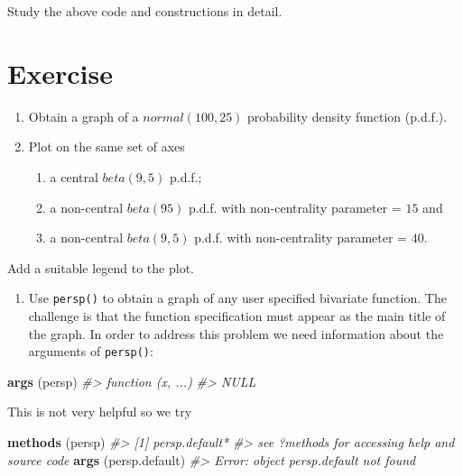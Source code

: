 \documentclass[
]{book}
\newenvironment{Shaded}{\begin{snugshade}}{\end{snugshade}}
\newcommand{\CommentTok}[1]{\textcolor[rgb]{0.56,0.35,0.01}{\textit{#1}}}
\newcommand{\FunctionTok}[1]{\textcolor[rgb]{0.13,0.29,0.53}{\textbf{#1}}}
\newcommand{\NormalTok}[1]{#1}
\providecommand{\tightlist}{%
  \setlength{\itemsep}{0pt}\setlength{\parskip}{0pt}}
\begin{document}
Study the above code and constructions in detail.

\section{Exercise}\label{exercise-9}

\begin{enumerate}
\def\labelenumi{\arabic{enumi}.}
\item
  Obtain a graph of a \(normal(100, 25)\) probability density function (p.d.f.).
\item
  Plot on the same set of axes

  \begin{enumerate}
  \def\labelenumii{(\roman{enumii})}
  \tightlist
  \item
    a central \(beta(9, 5)\) p.d.f.;
  \item
    a non-central \(beta(9 5)\) p.d.f. with non-centrality parameter = \(15\) and
  \item
    a non-central \(beta(9, 5)\) p.d.f. with non-centrality parameter = \(40\).
  \end{enumerate}
\end{enumerate}

Add a suitable legend to the plot.

\begin{enumerate}
\def\labelenumi{\arabic{enumi}.}
\setcounter{enumi}{2}
\tightlist
\item
  Use \texttt{persp()} to obtain a graph of any user specified bivariate function. The challenge is that the function specification must appear as the main title of the graph. In order to address this problem we need information about the arguments of \texttt{persp()}:
\end{enumerate}

\begin{Shaded}
\begin{Highlighting}[]
\FunctionTok{args}\NormalTok{ (persp)}
\CommentTok{\#\textgreater{} function (x, ...) }
\CommentTok{\#\textgreater{} NULL}
\end{Highlighting}
\end{Shaded}

This is not very helpful so we try

\begin{Shaded}
\begin{Highlighting}[]
\FunctionTok{methods}\NormalTok{ (persp)}
\CommentTok{\#\textgreater{} [1] persp.default*}
\CommentTok{\#\textgreater{} see \textquotesingle{}?methods\textquotesingle{} for accessing help and source code}
\FunctionTok{args}\NormalTok{ (persp.default)}
\CommentTok{\#\textgreater{} Error: object \textquotesingle{}persp.default\textquotesingle{} not found}
\end{Highlighting}
\end{Shaded}
\end{document}
